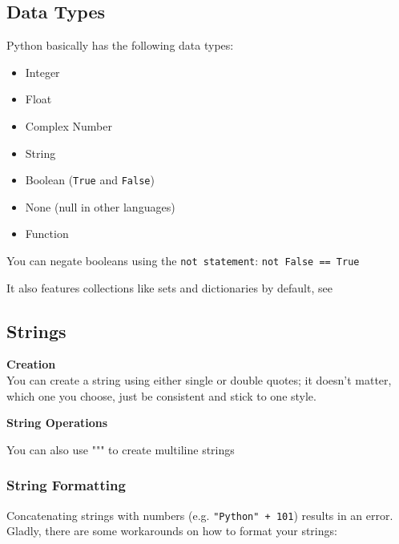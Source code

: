 
    \subsection{Data Types}
        Python basically has the following data types:
        \begin{itemize}
            \item Integer
            \item Float
            \item Complex Number
            \item String
            \item Boolean (\texttt{True} and \texttt{False})
            \item None (null in other languages)
            \item Function
        \end{itemize}

        You can negate booleans using the \texttt{not statement}:
        \texttt{not False == True}

        It also features collections like sets and dictionaries by default, see 

    \subsection{Strings}

        \begin{indentblock}

            \textbf{Creation} \\
            You can create a string using either single or double quotes;
            it doesn't matter, which one you choose, just be consistent and
            stick to one style.

            \textbf{String Operations} \\

        \end{indentblock}

        You can also use """ to create multiline strings

        \subsubsection{String Formatting}
            Concatenating strings with numbers (e.g. \texttt{"Python" + 101}) results
            in an error. \\
            Gladly, there are some workarounds on how to format your strings:

